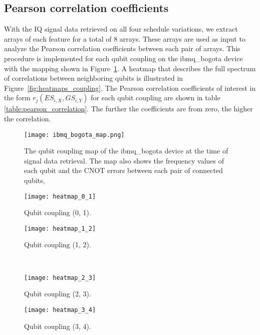 \documentclass[conference]{IEEEtran}
\begin{document}
\subsection{Pearson correlation coefficients}

With the IQ signal data retrieved on all four schedule variations, we extract arrays of each feature for a total of 8 arrays. These arrays are used as input to analyze the Pearson correlation coefficients between each pair of arrays. This procedure is implemented for each qubit coupling on the ibmq\_bogota device with the mapping shown in Figure~\ref{fig:coupling_map}. A heatmap that describes the full spectrum of correlations between neighboring qubits is illustrated in Figure~\ref{fig:heatmaps_coupling}. The Pearson correlation coefficients of interest in the form $ r_j(ES_{i,X}, GS_{i,Y}) $ for each qubit coupling are shown in table \ref{table:pearson_correlation}. The further the coefficients are from zero, the higher the correlation.

\begin{figure}
\centering
\texttt{[image: ibmq\_bogota\_map.png]}
\caption{The qubit coupling map of the ibmq\_bogota device at the time of signal data retrieval. The map also shows the frequency values of each qubit and the CNOT errors between each pair of connected qubits,}
\label{fig:coupling_map}
\end{figure}

\begin{figure*}
     \centering
     \begin{subfigure}[h]{0.45\textwidth}
         \centering
         \texttt{[image: heatmap\_0\_1]}
         \caption{Qubit coupling (0, 1).}
         \label{fig:heatmap_0_1}
     \end{subfigure}
     \hfill
     \begin{subfigure}[h]{0.45\textwidth}
         \centering
         \texttt{[image: heatmap\_1\_2]}
         \caption{Qubit coupling (1, 2).}
         \label{fig:heatmap_1_2}
     \end{subfigure}
     \hfill \\
     \begin{subfigure}[h]{0.45\textwidth}
         \centering
         \texttt{[image: heatmap\_2\_3]}
         \caption{Qubit coupling (2, 3).}
         \label{fig:heatmap_2_3}
     \end{subfigure}
     \hfill
     \begin{subfigure}[h]{0.45\textwidth}
         \centering
         \texttt{[image: heatmap\_3\_4]}
         \caption{Qubit coupling (3, 4).}
         \label{fig:heatmap_3_4}
     \end{subfigure}
        \caption{Heatmaps showing the Pearson correlation coefficients between each array belonging to the signal data of the four prepared schedules acting on each qubit coupling in the ibmq\_bogota device. The axes labels follow the following format for the signal data received: \{state\}\_\{couple qubit\}\_\{real or imaginary part of the complex number\}.}
        \label{fig:heatmaps_coupling}
\end{figure*}
\end{document}
